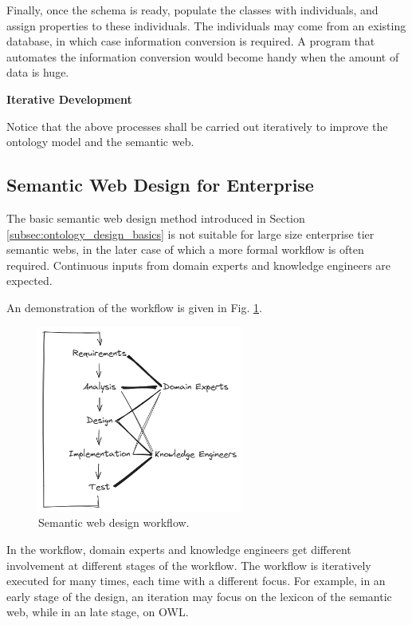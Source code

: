 Finally, once the schema is ready, populate the classes with individuals, and assign properties to these individuals. The individuals may come from an existing database, in which case information conversion is required. A program that automates the information conversion would become handy when the amount of data is huge.

\vspace{0.1in}
\noindent \textbf{Iterative Development}
\vspace{0.1in}

Notice that the above processes shall be carried out iteratively to improve the ontology model and the semantic web. 

\subsection{Semantic Web Design for Enterprise}

The basic semantic web design method introduced in Section \ref{subsec:ontology_design_basics} is not suitable for large size enterprise tier semantic webs, in the later case of which a more formal workflow is often required. Continuous inputs from domain experts and knowledge engineers are expected.

An demonstration of the workflow is given in Fig. \ref{fig:swdesignwf}.
\begin{figure}[htbp]
	\centering
	\includegraphics[width=0.6\textwidth]{./chapters/ch-semanticwebpractice/figures/semantic_web_design_workflow.png}
	\caption{Semantic web design workflow.}
	\label{fig:swdesignwf}
\end{figure}
In the workflow, domain experts and knowledge engineers get different involvement at different stages of the workflow. The workflow is iteratively executed for many times, each time with a different focus. For example, in an early stage of the design, an iteration may focus on the lexicon of the semantic web, while in an late stage, on OWL.

